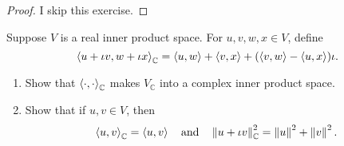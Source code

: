 \begin{proof}
    I skip this exercise.
\end{proof}
\newpage

\begin{exercise}
    Suppose $V$ is a real inner product space. For $u, v, w, x \in V$, define
    \[
        \left\langle{u + \iota v, w + \iota x}\right\rangle_{\mathbb{C}} = \left\langle{u, w}\right\rangle + \left\langle{v, x}\right\rangle + (\left\langle{v, w}\right\rangle - \left\langle{u, x}\right\rangle)\iota.
    \]

    \begin{enumerate}[label={(\alph*)}]
        \item Show that ${\left\langle{\cdot, \cdot}\right\rangle}_{\mathbb{C}}$ makes $V_{\mathbb{C}}$ into a complex inner product space.
        \item Show that if $u, v\in V$, then
              \[
                  {\left\langle{u, v}\right\rangle}_{\mathbb{C}} = \left\langle{u, v}\right\rangle \quad\text{and}\quad \left\Vert{u + \iota v}\right\Vert_{\mathbb{C}}^{2} = \left\Vert{u}\right\Vert^{2} + \left\Vert{v}\right\Vert^{2}.
              \]
    \end{enumerate}
\end{exercise}

